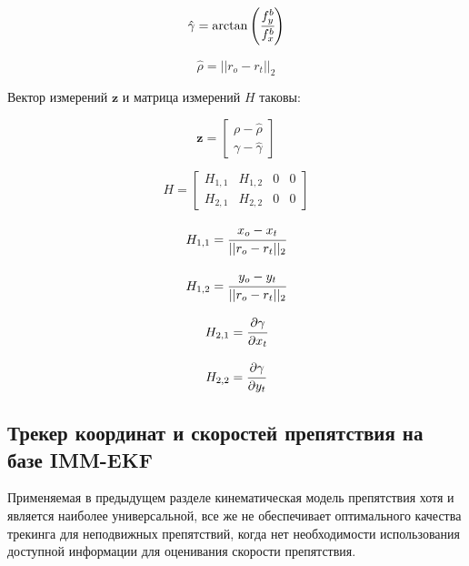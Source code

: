 \documentclass[14pt]{article}
\begin{document}
\begin{equation}
\hat \gamma = \arctan\left( \cfrac{f^b_y}{f^b_x} \right)
\end{equation}    

\begin{equation}
 \hat \rho = ||r_o - r_t||_2
\end{equation}

Вектор измерений $\mathbf z$ и матрица измерений $H$ таковы: 

\begin{equation}
   \mathbf z = 	\begin{bmatrix} \rho - \hat\rho \\ \gamma - \hat\gamma  \end{bmatrix}
\end{equation}

\begin{equation}
   H = \begin{bmatrix}  H_{1, 1} & H_{1, 2} & 0 & 0 \\ H_{2, 1} & H_{2, 2} & 0 & 0  \end{bmatrix}
\end{equation}

\begin{equation*}
H_{1, 1} =  \cfrac{x_o - x_t} {||r_o - r_t||_2}
\end{equation*}

\begin{equation*}
H_{1, 2} =  \cfrac{y_o - y_t} {||r_o - r_t||_2}
\end{equation*}

\begin{equation*}
H_{2, 1} = \cfrac{\partial \gamma}{\partial x_t}
\end{equation*}

\begin{equation*}
H_{2, 2} = \cfrac{\partial \gamma}{\partial y_t}
\end{equation*}


\subsection{Трекер координат и скоростей препятствия на базе IMM-EKF}
Применяемая в предыдущем разделе  кинематическая модель препятствия хотя и является наиболее универсальной, все же не обеспечивает оптимального качества трекинга для неподвижных препятствий, когда нет необходимости использования доступной информации для оценивания скорости препятствия. 
\end{document}
